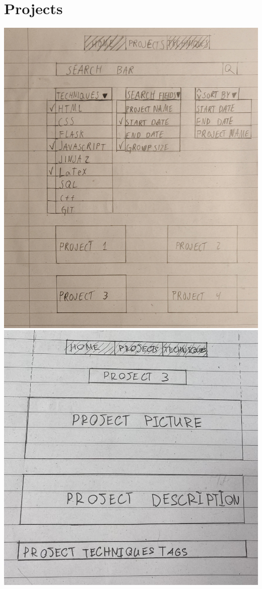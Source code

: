 \documentclass{TDP003mall}
\begin{document}
\section{Projects}
\begin{center}
\includegraphics[scale=0.25]{Projects2.jpg}
\includegraphics[scale=0.25]{Project.jpg}
\end{center}
\end{document}
